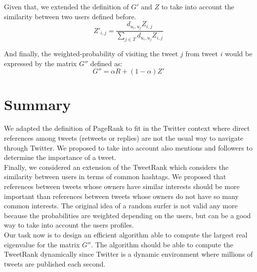 \documentclass[12pt,a4paper]{article}
\begin{document}
Given that, we extended the definition of $G'$ and $Z$ to take into account the similarity between two users defined before. 
\begin{equation}
Z'_{i,j} = \frac{d_{u_i,u_j} Z_{i,j}}{\sum_{j \in T}{d_{u_i,u_j} Z_{i,j}}}
\end{equation}

And finally, the weighted-probability of visiting the tweet $j$ from tweet $i$ would be expressed by the matrix $G''$ defined as:
\begin{equation}
G'' = \alpha R + (1 - \alpha) Z'
\end{equation}

\section{Summary}
We adapted the definition of PageRank to fit in the Twitter context where direct references among tweets (retweets or replies) are not the usual way to navigate through Twitter. We proposed to take into account also mentions and followers to determine the importance of a tweet. \\

Finally, we considered an extension of the TweetRank which considers the similarity between users in terms of common hashtags. We proposed that references between tweets whose owners have similar interests should be more important than references between tweets whose owners do not have so many common interests. The original idea of a random surfer is not valid any more because the probabilities are weighted depending on the users, but can be a good way to take into account the users profiles. \\

Our task now is to design an efficient algorithm able to compute the largest real eigenvalue for the matrix $G''$. The algorithm should be able to compute the TweetRank dynamically since Twitter is a dynamic environment where millions of tweets are published each second.
\end{document}
